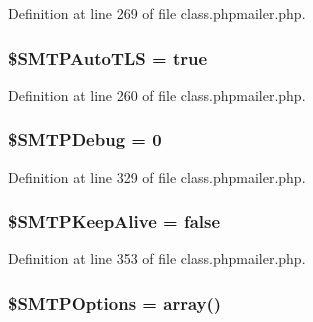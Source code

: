 Definition at line 269 of file class.\+phpmailer.\+php.

\subsubsection[{\texorpdfstring{\$\+S\+M\+T\+P\+Auto\+T\+LS}{$SMTPAutoTLS}}]{\setlength{\rightskip}{0pt plus 5cm}\$S\+M\+T\+P\+Auto\+T\+LS = true}\hypertarget{class_p_h_p_mailer_a1765f2c1205d3c2c0b7000ec66e2805f}{}\label{class_p_h_p_mailer_a1765f2c1205d3c2c0b7000ec66e2805f}


Definition at line 260 of file class.\+phpmailer.\+php.

\subsubsection[{\texorpdfstring{\$\+S\+M\+T\+P\+Debug}{$SMTPDebug}}]{\setlength{\rightskip}{0pt plus 5cm}\$S\+M\+T\+P\+Debug = 0}\hypertarget{class_p_h_p_mailer_a5f952b7bed25b8423aec0a5b308d4bb1}{}\label{class_p_h_p_mailer_a5f952b7bed25b8423aec0a5b308d4bb1}


Definition at line 329 of file class.\+phpmailer.\+php.

\subsubsection[{\texorpdfstring{\$\+S\+M\+T\+P\+Keep\+Alive}{$SMTPKeepAlive}}]{\setlength{\rightskip}{0pt plus 5cm}\$S\+M\+T\+P\+Keep\+Alive = false}\hypertarget{class_p_h_p_mailer_a7ff340050ca2061f7dc63b92e3f18586}{}\label{class_p_h_p_mailer_a7ff340050ca2061f7dc63b92e3f18586}


Definition at line 353 of file class.\+phpmailer.\+php.

\subsubsection[{\texorpdfstring{\$\+S\+M\+T\+P\+Options}{$SMTPOptions}}]{\setlength{\rightskip}{0pt plus 5cm}\$S\+M\+T\+P\+Options = array()}\hypertarget{class_p_h_p_mailer_a5d73e4c2277f6435448b321e98794bf5}{}\label{class_p_h_p_mailer_a5d73e4c2277f6435448b321e98794bf5}


